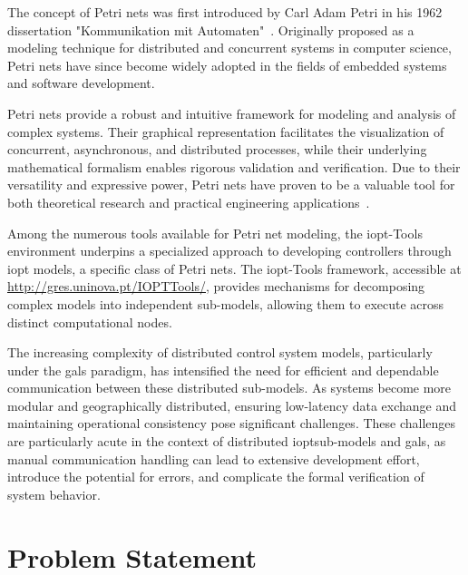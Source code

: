 The concept of Petri nets was first introduced by Carl Adam Petri in his 1962 dissertation "Kommunikation mit Automaten"~\cite{petri1962}. Originally proposed as a modeling technique for distributed and concurrent systems in computer science, Petri nets have since become widely adopted in the fields of embedded systems and software development.

Petri nets provide a robust and intuitive framework for modeling and analysis of complex systems. Their graphical representation facilitates the visualization of concurrent, asynchronous, and distributed processes, while their underlying mathematical formalism enables rigorous validation and verification. Due to their versatility and expressive power, Petri nets have proven to be a valuable tool for both theoretical research and practical engineering applications~\cite{murata}.

Among the numerous tools available for Petri net modeling, the \gls{iopt}-Tools environment underpins a specialized approach to developing controllers through \gls{iopt} models, a specific class of Petri nets. The \gls{iopt}-Tools framework, accessible at \url{http://gres.uninova.pt/IOPTTools/}, provides mechanisms for decomposing complex models into independent sub-models, allowing them to execute across distinct computational nodes.

The increasing complexity of distributed control system models, particularly under the \gls{gals} paradigm, has intensified the need for efficient and dependable communication between these distributed sub-models. As systems become more modular and geographically distributed, ensuring low-latency data exchange and maintaining operational consistency pose significant challenges. These challenges are particularly acute in the context of distributed \gls{iopt}sub-models and \gls{gals}, as manual communication handling can lead to extensive development effort, introduce the potential for errors, and complicate the formal verification of system behavior.

\section{Problem Statement}
\label{sec:problem_statement}


